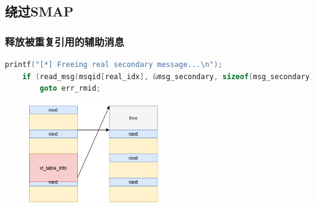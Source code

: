 \documentclass[xcolor=table]{beamer}
\begin{document}
\subsection{绕过SMAP}

\begin{frame}[fragile]
\frametitle{释放被重复引用的辅助消息}

\tiny\begin{lstlisting}[language=c]
    printf("[*] Freeing real secondary message...\n");
    if (read_msg(msqid[real_idx], &msg_secondary, sizeof(msg_secondary), MTYPE_SECONDARY) < 0)
        goto err_rmid;
\end{lstlisting}

\begin{figure}[H]
\centering
\includegraphics[width=0.5\textwidth]{pic/5}%
\end{figure}


\end{frame}
\end{document}
